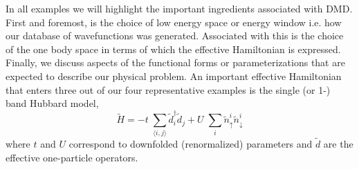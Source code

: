 In all examples we will highlight the important ingredients associated with DMD. First and foremost, is the choice 
of low energy space or energy window i.e. how our database of wavefunctions was generated. Associated with this is 
the choice of the one body space in terms of which the effective Hamiltonian is expressed. Finally, we discuss 
aspects of the functional forms or parameterizations that are expected to describe our physical 
problem. An important effective Hamiltonian that enters three out of our four representative examples is 
the single (or 1-) band Hubbard model,
\begin{equation}
	\tilde{H} = -t \;\sum_{\langle i,j \rangle} \tilde{d}_i^{\dagger} \tilde{d}_j + U \;\sum_{i} \tilde{n}^{i}_{\uparrow} \tilde{n}^{i}_{\downarrow}
\label{eq:oneband}
\end{equation}
where $t$ and $U$ correspond to downfolded (renormalized) parameters and $\tilde{d}$ are the effective one-particle operators. 

